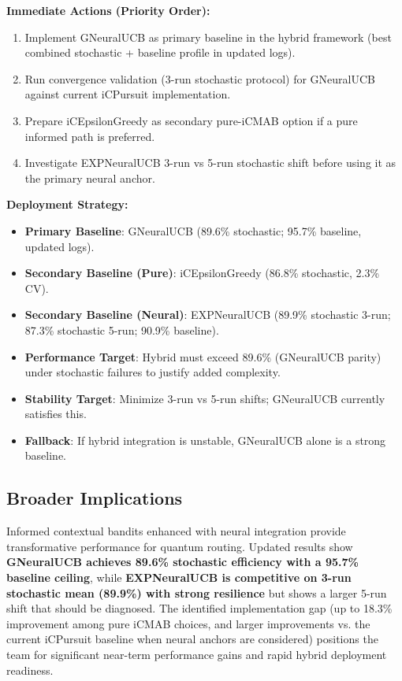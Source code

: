\documentclass[12pt,a4paper]{article}
\newcommand{\legacy}[1]{\textcolor{legacycolor}{\textbf{#1}}}
\newcommand{\neural}[1]{\textcolor{neuralcolor}{\textbf{#1}}}
\begin{document}
\textbf{Immediate Actions (Priority Order):}
\begin{enumerate}
\item Implement GNeuralUCB as primary baseline in the hybrid framework (best combined stochastic + baseline profile in updated logs).
\item Run convergence validation (3-run stochastic protocol) for GNeuralUCB against current iCPursuit implementation.
\item Prepare iCEpsilonGreedy as secondary pure-iCMAB option if a pure informed path is preferred.
\item Investigate EXPNeuralUCB 3-run vs 5-run stochastic shift before using it as the primary neural anchor.
\end{enumerate}

\textbf{Deployment Strategy:}
\begin{itemize}
\item \textbf{Primary Baseline}: GNeuralUCB (89.6\% stochastic; 95.7\% baseline, updated logs).
\item \textbf{Secondary Baseline (Pure)}: iCEpsilonGreedy (86.8\% stochastic, 2.3\% CV).
\item \textbf{Secondary Baseline (Neural)}: EXPNeuralUCB (89.9\% stochastic 3-run; 87.3\% stochastic 5-run; 90.9\% baseline).
\item \textbf{Performance Target}: Hybrid must exceed 89.6\% (GNeuralUCB parity) under stochastic failures to justify added complexity.
\item \textbf{Stability Target}: Minimize 3-run vs 5-run shifts; GNeuralUCB currently satisfies this.
\item \textbf{Fallback}: If hybrid integration is unstable, GNeuralUCB alone is a strong baseline.
\end{itemize}

\subsection{Broader Implications}

Informed contextual bandits enhanced with neural integration provide transformative performance for quantum routing. Updated results show \neural{GNeuralUCB achieves 89.6\% stochastic efficiency with a 95.7\% baseline ceiling}, while \legacy{EXPNeuralUCB is competitive on 3-run stochastic mean (89.9\%) with strong resilience} but shows a larger 5-run shift that should be diagnosed. The identified implementation gap (up to 18.3\% improvement among pure iCMAB choices, and larger improvements vs. the current iCPursuit baseline when neural anchors are considered) positions the team for significant near-term performance gains and rapid hybrid deployment readiness.
\end{document}
